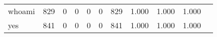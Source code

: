 \begin{longtable}{lp{1.10cm}p{1.10cm}p{1.10cm}p{1.10cm}p{1.10cm}p{1.10cm}p{1.10cm}p{1.10cm}p{1.10cm}p{1.10cm}}
whoami    &                    829 &                                  0 &                                 0 &                                0 &                                 0 &                             829 &                             1.000 &                                 1.000 &                               1.000 \\
yes       &                    841 &                                  0 &                                 0 &                                0 &                                 0 &                             841 &                             1.000 &                                 1.000 &                               1.000 \\
\end{longtable}
